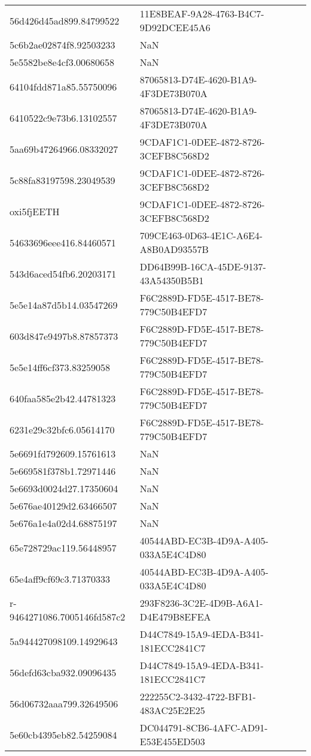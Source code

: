 \begin{tabular}{ll}
56d426d45ad899.84799522 & 11E8BEAF-9A28-4763-B4C7-9D92DCEE45A6 \\
5c6b2ae02874f8.92503233 & NaN \\
5e5582be8e4cf3.00680658 & NaN \\
64104fdd871a85.55750096 & 87065813-D74E-4620-B1A9-4F3DE73B070A \\
6410522c9e73b6.13102557 & 87065813-D74E-4620-B1A9-4F3DE73B070A \\
5aa69b47264966.08332027 & 9CDAF1C1-0DEE-4872-8726-3CEFB8C568D2 \\
5c88fa83197598.23049539 & 9CDAF1C1-0DEE-4872-8726-3CEFB8C568D2 \\
oxi5fjEETH & 9CDAF1C1-0DEE-4872-8726-3CEFB8C568D2 \\
54633696eee416.84460571 & 709CE463-0D63-4E1C-A6E4-A8B0AD93557B \\
543d6aced54fb6.20203171 & DD64B99B-16CA-45DE-9137-43A54350B5B1 \\
5e5e14a87d5b14.03547269 & F6C2889D-FD5E-4517-BE78-779C50B4EFD7 \\
603d847e9497b8.87857373 & F6C2889D-FD5E-4517-BE78-779C50B4EFD7 \\
5e5e14ff6cf373.83259058 & F6C2889D-FD5E-4517-BE78-779C50B4EFD7 \\
640faa585e2b42.44781323 & F6C2889D-FD5E-4517-BE78-779C50B4EFD7 \\
6231e29c32bfc6.05614170 & F6C2889D-FD5E-4517-BE78-779C50B4EFD7 \\
5e6691fd792609.15761613 & NaN \\
5e669581f378b1.72971446 & NaN \\
5e6693d0024d27.17350604 & NaN \\
5e676ae40129d2.63466507 & NaN \\
5e676a1e4a02d4.68875197 & NaN \\
65e728729ac119.56448957 & 40544ABD-EC3B-4D9A-A405-033A5E4C4D80 \\
65e4aff9cf69c3.71370333 & 40544ABD-EC3B-4D9A-A405-033A5E4C4D80 \\
r-9464271086.7005146fd587c2 & 293F8236-3C2E-4D9B-A6A1-D4E479B8EFEA \\
5a944427098109.14929643 & D44C7849-15A9-4EDA-B341-181ECC2841C7 \\
56defd63cba932.09096435 & D44C7849-15A9-4EDA-B341-181ECC2841C7 \\
56d06732aaa799.32649506 & 222255C2-3432-4722-BFB1-483AC25E2E25 \\
5e60cb4395eb82.54259084 & DC044791-8CB6-4AFC-AD91-E53E455ED503 \\

\end{tabular}
